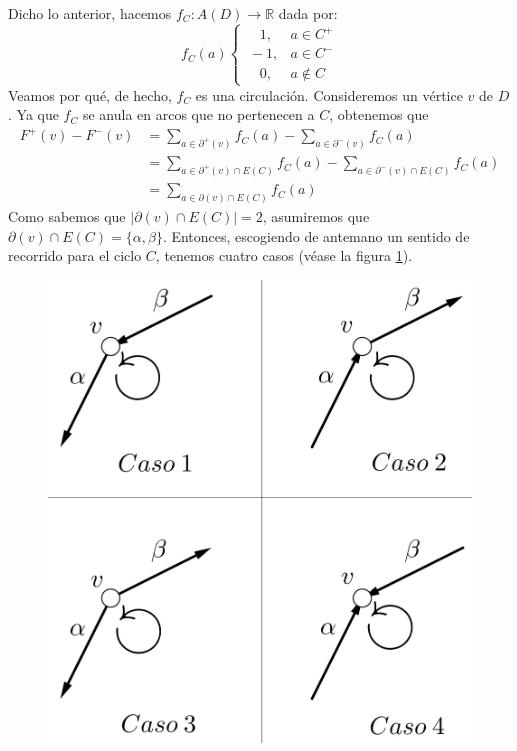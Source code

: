 Dicho lo anterior, hacemos $f_{C} \colon A(D) \rightarrow \mathbb{R}$ dada por:
$$
f_{C}(a)\left\{\begin{matrix}
\quad 1, & a \in C^{+} \\ 
\ -1, & a \in C^{-}\\ 
\quad 0, &a \notin C
\end{matrix}\right.
$$
Veamos por qué, de hecho, $f_{C}$ es una circulación. Consideremos un vértice $v$ de $D$. Ya que $f_{C}$ se anula en arcos que no pertenecen a $C$, obtenemos que
\begin{equation} \label{eq:cortescicloscasos}
    \begin{split}
               F^{+}(v) - F^{-}(v) &= \sum_{a \in \partial^{+}(v)} f_{C}(a) - \sum_{a \in \partial^{-}(v)} f_{C}(a) \\
    &= \sum_{a \in \partial^{+}(v) \cap E(C)} f_{C}(a) - \sum_{a \in \partial^{-}(v) \cap E(C)} f_{C}(a) \\
    &= \sum_{a \in \partial(v) \cap E(C)} f_{C}(a)
    \end{split}
\end{equation}
Como sabemos que $|\partial(v) \cap E(C)| = 2$, asumiremos que $\partial(v) \cap E(C) = \{\alpha, \beta\}$. Entonces, escogiendo de antemano un sentido de recorrido para el ciclo $C$, tenemos cuatro casos (véase la figura \ref{fig:casoscortesciclos}). 
 \begin{figure}[H]
\centering
\includegraphics[scale=0.2]{img/imgchapter2/digraficacicloscasos.jpg}
\caption{}
\label{fig:casoscortesciclos}
\end{figure}

